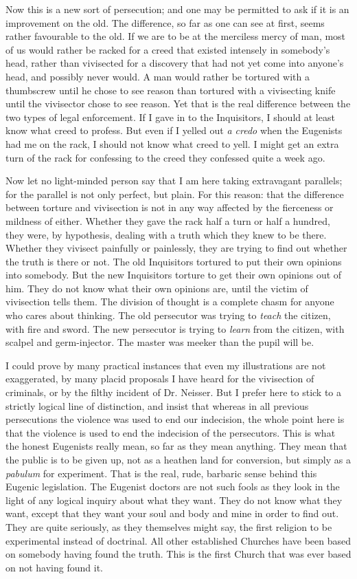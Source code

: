 \documentclass{book}
\begin{document}
Now this is a new sort of persecution; and one may be permitted to ask if it is an improvement on the old. The difference, so far as one can see at first, seems rather favourable to the old. If we are to be at the merciless mercy of man, most of us would rather be racked for a creed that existed intensely in somebody’s head, rather than vivisected for a discovery that had not yet come into anyone’s head, and possibly never would. A man would rather be tortured with a thumbscrew until he chose to see reason than tortured with a vivisecting knife until the vivisector chose to see reason. Yet that is the real difference between the two types of legal enforcement. If I gave in to the Inquisitors, I should at least know what creed to profess. But even if I yelled out \emph{a credo} when the Eugenists had me on the rack, I should not know what creed to yell. I might get an extra turn of the rack for confessing to the creed they confessed quite a week ago.

Now let no light-minded person say that I am here taking extravagant parallels; for the parallel is not only perfect, but plain. For this reason: that the difference between torture and vivisection is not in any way affected by the fierceness or mildness of either. Whether they gave the rack half a turn or half a hundred, they were, by hypothesis, dealing with a truth which they knew to be there. Whether they vivisect painfully or painlessly, they are trying to find out whether the truth is there or not. The old Inquisitors tortured to put their own opinions into somebody. But the new Inquisitors torture to get their own opinions out of him. They do not know what their own opinions are, until the victim of vivisection tells them. The division of thought is a complete chasm for anyone who cares about thinking. The old persecutor was trying to \emph{teach} the citizen, with fire and sword. The new persecutor is trying to \emph{learn} from the citizen, with scalpel and germ-injector. The master was meeker than the pupil will be.

I could prove by many practical instances that even my illustrations are not exaggerated, by many placid proposals I have heard for the vivisection of criminals, or by the filthy incident of Dr. Neisser. But I prefer here to stick to a strictly logical line of distinction, and insist that whereas in all previous persecutions the violence was used to end our indecision, the whole point here is that the violence is used to end the indecision of the persecutors. This is what the honest Eugenists really mean, so far as they mean anything. They mean that the public is to be given up, not as a heathen land for conversion, but simply as a \emph{pabulum} for experiment. That is the real, rude, barbaric sense behind this Eugenic legislation. The Eugenist doctors are not such fools as they look in the light of any logical inquiry about what they want. They do not know what they want, except that they want your soul and body and mine in order to find out. They are quite seriously, as they themselves might say, the first religion to be experimental instead of doctrinal. All other established Churches have been based on somebody having found the truth. This is the first Church that was ever based on not having found it.
\end{document}
